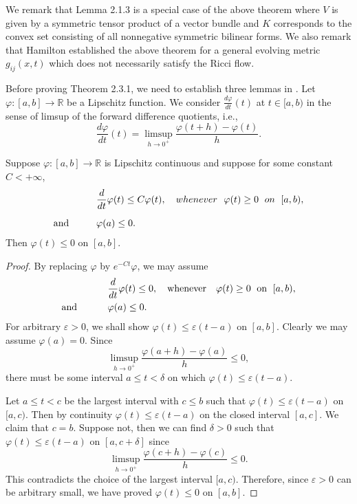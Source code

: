 We remark that Lemma 2.1.3 is a special case of the above theorem
where $V$ is given by a symmetric tensor product of a vector
bundle and $K$ corresponds to the convex set consisting of all
nonnegative symmetric bilinear forms. We also remark that Hamilton
\cite{Ha86} established the above theorem for a general evolving
metric $g_{ij}(x,t)$ which does not necessarily satisfy the Ricci
flow.

Before proving Theorem 2.3.1, we need to establish three lemmas in
\cite{Ha86}. Let $\varphi:[a,b]\rightarrow \mathbb{R}$ be a
Lipschitz function. We consider $\frac{d\varphi}{dt}(t)$ at
$t\in[a,b)$ in the sense of limsup of the forward difference
quotients, i.e.,
$$
\frac{d\varphi}{dt}(t) =\limsup_{h\rightarrow
0^+}\frac{\varphi(t+h)-\varphi(t)}{h}.
$$

\begin{lemma}
  \label{lem:cz-vanishing-from-a-lipschitz-differential-inequality}
Suppose $\varphi: [a,b]\rightarrow \mathbb{R}$ is Lipschitz
continuous and suppose for some constant $C<+\infty$,
\begin{align*}
&  \frac{d}{dt}\varphi(t)\le C\varphi(t),\quad whenever\ \
\varphi(t)\ge 0\;\ on\ \;[a,b),\\[2mm]
\text{and}\hskip 1cm &  \varphi(a)\le 0.
\end{align*}
Then $\varphi(t)\le 0$ on $[a,b]$.
\end{lemma}

\begin{proof}
By replacing $\varphi$ by $e^{-Ct}\varphi$, we may assume
\begin{align*}
&  \frac{d}{dt}\varphi(t)\le 0,\quad \text{whenever}\quad
\varphi(t)\ge 0\;\mbox{ on }\;[a,b),\\
\mbox{and }\hskip 1cm &  \varphi(a)\le 0.
\end{align*}
For arbitrary $\varepsilon>0$, we shall show $\varphi(t)\le
\varepsilon (t-a)$ on $[a,b]$. Clearly we may assume
$\varphi(a)=0$. Since
$$
\limsup_{h\rightarrow 0^+}\frac{\varphi(a+h)-\varphi(a)}{h}\le 0,
$$
there must be some interval $a\le t<\delta$ on which
$\varphi(t)\le \varepsilon (t-a)$.

Let $a\le t<c$ be the largest interval with $c\le b$ such that
$\varphi(t)\le \varepsilon (t-a)$ on $[a,c)$. Then by continuity
$\varphi(t)\le \varepsilon (t-a)$ on the closed interval $[a,c]$.
We claim that $c=b$. Suppose not, then we can find $\delta>0$ such
that $\varphi(t)\le \varepsilon (t-a)$ on $[a,c+\delta]$ since
$$
\limsup_{h\rightarrow 0^+}\frac{\varphi(c+h)-\varphi(c)}{h}\le 0.
$$
This contradicts the choice of the largest interval $[a,c)$.
Therefore, since $\varepsilon>0$ can be arbitrary small, we have
proved $\varphi(t)\le 0$ on $[a,b]$.
\end{proof}

